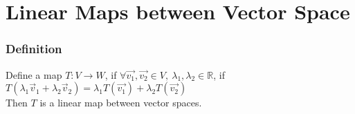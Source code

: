\documentclass{article}
\begin{document}
\section*{Linear Maps between Vector Space}
\subsubsection*{Definition}
Define a map \(T:V\longrightarrow W\), if \(\forall \overrightarrow{v_1},\overrightarrow{v_2}\in V,\ \lambda_1,\lambda_2\in\mathbb{R}\), if 
\\\(T(\lambda_1\overrightarrow{v}_1+\lambda_2\overrightarrow{v}_2)=\lambda_1T(\overrightarrow{v_1})+\lambda_2T(\overrightarrow{v_2})\)\\
Then \(T\) is a linear map between vector spaces.
\end{document}
